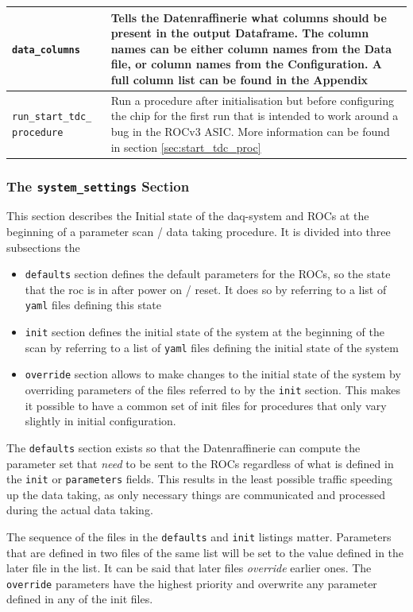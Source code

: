 \documentclass[11pt]{article}
\begin{document}
\begin{center}
\begin{tabular}{| m{3cm} | m{10cm} |}
\verb|data_columns| & Tells the Datenraffinerie what columns should be present in the output Dataframe. The column names can be either column names from the Data file, or column names from the Configuration. A full column list can be found in the Appendix \\ \hline %
\verb|run_start_tdc_| \verb|procedure| & Run a procedure after initialisation but before configuring the chip for the first run that is intended to work around a bug in the ROCv3 ASIC. More information can be found in section \ref{sec:start_tdc_proc}\\ \hline
\end{tabular}
\end{center}

\subsubsection{The \texttt{system\_settings} Section}\label{sec:system_settings}
This section describes the Initial state of the daq-system and ROCs at the beginning of a parameter scan / data taking procedure. It is divided into three subsections the
\begin{itemize}
	\item \verb|defaults| section defines the default parameters for the ROCs, so the state that the roc is in after power on / reset. It does so by referring to a list of \texttt{yaml} files defining this state
	\item \verb|init| section defines the initial state of the system at the beginning of the scan by referring to a list of \texttt{yaml} files defining the initial state of the system
	\item \verb|override| section allows to make changes to the initial state of the system by overriding parameters of the files referred to by the \verb|init| section. This makes it possible to have a common set of init files for procedures that only vary slightly in initial configuration. 
\end{itemize}
The \texttt{defaults} section exists so that the Datenraffinerie can compute the parameter set that \emph{need} to be sent to the ROCs regardless of what is defined in the \texttt{init} or \texttt{parameters} fields. This results in the least possible traffic speeding up the data taking, as only necessary things are communicated and processed during the actual data taking.
 
The sequence of the files in the \texttt{defaults} and \texttt{init} listings matter. Parameters that are defined in two files of the same list will be set to the value defined in the later file in the list. It can be said that later files \emph{override} earlier ones. The \texttt{override} parameters have the highest priority and overwrite any parameter defined in any of the init files.
\end{document}
